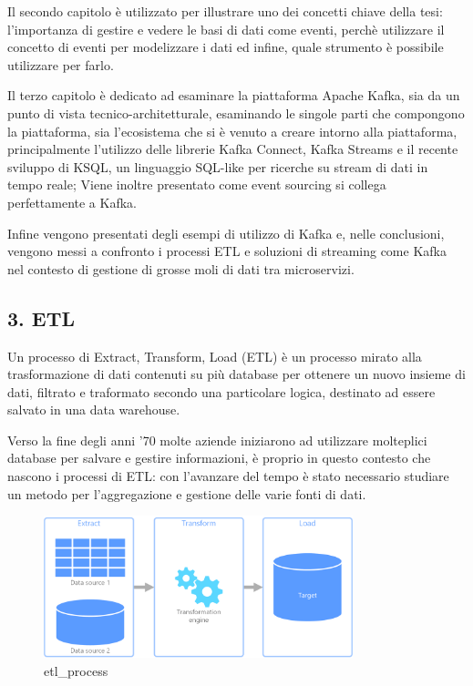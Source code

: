 \documentclass[]{article}
\begin{document}
Il secondo capitolo è utilizzato per illustrare uno dei concetti chiave
della tesi: l'importanza di gestire e vedere le basi di dati come
eventi, perchè utilizzare il concetto di eventi per modelizzare i dati
ed infine, quale strumento è possibile utilizzare per farlo.

Il terzo capitolo è dedicato ad esaminare la piattaforma Apache Kafka,
sia da un punto di vista tecnico-architetturale, esaminando le singole
parti che compongono la piattaforma, sia l'ecosistema che si è venuto a
creare intorno alla piattaforma, principalmente l'utilizzo delle
librerie Kafka Connect, Kafka Streams e il recente sviluppo di KSQL, un
linguaggio SQL-like per ricerche su stream di dati in tempo reale; Viene
inoltre presentato come event sourcing si collega perfettamente a Kafka.

Infine vengono presentati degli esempi di utilizzo di Kafka e, nelle
conclusioni, vengono messi a confronto i processi ETL e soluzioni di
streaming come Kafka nel contesto di gestione di grosse moli di dati tra
microservizi.

\newpage

\hypertarget{etl}{\subsection{3. ETL}\label{etl}}

Un processo di Extract, Transform, Load (ETL) è un processo mirato alla
trasformazione di dati contenuti su più database per ottenere un nuovo
insieme di dati, filtrato e traformato secondo una particolare logica,
destinato ad essere salvato in una data warehouse.

Verso la fine degli anni '70 molte aziende iniziarono ad utilizzare
molteplici database per salvare e gestire informazioni, è proprio in
questo contesto che nascono i processi di ETL: con l'avanzare del tempo
è stato necessario studiare un metodo per l'aggregazione e gestione
delle varie fonti di dati.

\begin{figure}
\centering
\includegraphics[width=0.80000\textwidth]{../images/etl.png}
\caption{etl\_process \label{figure_4}}
\end{figure}
\end{document}
